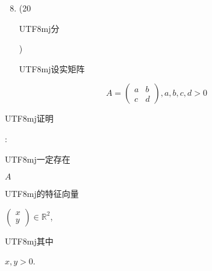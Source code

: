 \documentclass[10pt]{article}
\begin{document}
\begin{enumerate}
  \setcounter{enumi}{7}
  \item (20 \begin{CJK}{UTF8}{mj}分\end{CJK}) \begin{CJK}{UTF8}{mj}设实矩阵\end{CJK}
\end{enumerate}
$$
A=\left(\begin{array}{ll}
a & b \\
c & d
\end{array}\right), a, b, c, d>0
$$
\begin{CJK}{UTF8}{mj}证明\end{CJK}: \begin{CJK}{UTF8}{mj}一定存在\end{CJK} $A$ \begin{CJK}{UTF8}{mj}的特征向量\end{CJK} $\left(\begin{array}{l}x \\ y\end{array}\right) \in \mathbb{R}^{2}$, \begin{CJK}{UTF8}{mj}其中\end{CJK} $x, y>0$.
\end{document}
